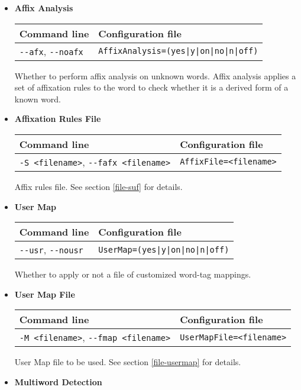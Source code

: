 \documentclass[a4paper]{book}
\begin{document}
\begin{itemize}
\item {\bf Affix Analysis}

\begin{tabular}{|l|l|}
Command line                     & Configuration file   \\ \hline
\verb#--afx#, \verb#--noafx#   & \verb#AffixAnalysis=(yes|y|on|no|n|off)# \\ \hline
\end{tabular}

  Whether to perform affix analysis on unknown words. 
  Affix analysis applies a set of  affixation rules to the word to check whether it is a derived form of a known word.

\item {\bf Affixation Rules File}

\begin{tabular}{|l|l|}
Command line       & Configuration file   \\ \hline
\verb#-S <filename>#, \verb#--fafx <filename>#  & \verb#AffixFile=<filename># \\ \hline  
\end{tabular}

   Affix rules file. See section \ref{file-suf} for details.

\item {\bf User Map}

\begin{tabular}{|l|l|}
Command line                     & Configuration file   \\ \hline
\verb#--usr#, \verb#--nousr#   & \verb#UserMap=(yes|y|on|no|n|off)# \\ \hline
\end{tabular}

  Whether to apply or not a file of customized word-tag mappings.

\item {\bf User Map File}

\begin{tabular}{|l|l|}
Command line       & Configuration file   \\ \hline
\verb#-M <filename>#, \verb#--fmap <filename>#  & \verb#UserMapFile=<filename># \\ \hline  
\end{tabular}

   User Map file to be used. See section \ref{file-usermap} for details.


\item {\bf Multiword Detection}


\end{itemize}
\end{document}
